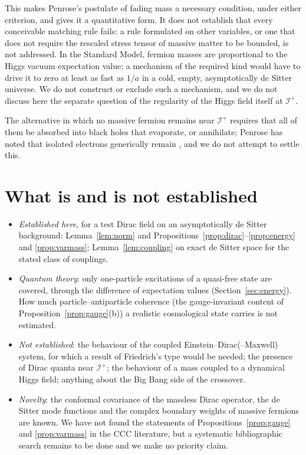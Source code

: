 \documentclass[11pt,a4paper]{article}
\theoremstyle{definition}
\newcommand{\scri}{\mathscr{I}^{+}}
\begin{document}
This makes Penrose's postulate of fading mass a necessary condition, under either criterion, and gives it a quantitative form. It does not establish that every conceivable matching rule fails: a rule formulated on other variables, or one that does not require the rescaled stress tensor of massive matter to be bounded, is not addressed. In the Standard Model, fermion masses are proportional to the Higgs vacuum expectation value; a mechanism of the required kind would have to drive it to zero at least as fast as $1/a$ in a cold, empty, asymptotically de Sitter universe. We do not construct or exclude such a mechanism, and we do not discuss here the separate question of the regularity of the Higgs field itself at $\scri$.

The alternative in which no massive fermion remains near $\scri$ requires that all of them be absorbed into black holes that evaporate, or annihilate; Penrose has noted that isolated electrons generically remain \cite{Penrose2010}, and we do not attempt to settle this.

\section{What is and is not established}
\label{sec:scope}

\begin{itemize}[leftmargin=1.5em]
\item \emph{Established here}, for a test Dirac field on an asymptotically de Sitter background: Lemma~\ref{lem:norm} and Propositions~\ref{prop:dirac}--\ref{prop:energy} and \ref{prop:varmass}; Lemma~\ref{lem:coupling} on exact de Sitter space for the stated class of couplings.
\item \emph{Quantum theory}: only one-particle excitations of a quasi-free state are covered, through the difference of expectation values (Section~\ref{sec:energy}). How much particle--antiparticle coherence (the gauge-invariant content of Proposition~\ref{prop:gauge}(b)) a realistic cosmological state carries is not estimated.
\item \emph{Not established}: the behaviour of the coupled Einstein--Dirac(--Maxwell) system, for which a result of Friedrich's type would be needed; the presence of Dirac quanta near $\scri$; the behaviour of a mass coupled to a dynamical Higgs field; anything about the Big Bang side of the crossover.
\item \emph{Novelty}: the conformal covariance of the massless Dirac operator, the de Sitter mode functions and the complex boundary weights of massive fermions are known. We have not found the statements of Propositions~\ref{prop:gauge} and \ref{prop:varmass} in the CCC literature, but a systematic bibliographic search remains to be done and we make no priority claim.
\end{itemize}
\end{document}
